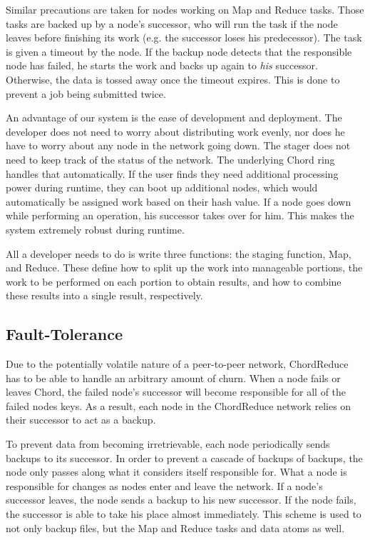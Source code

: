 \documentclass[10pt, conference, compsocconf]{IEEEtran}
\begin{document}
Similar precautions are taken for nodes working on Map and Reduce tasks.  Those tasks are backed up by a node's successor, who will run the task if the node leaves before finishing its work (e.g. the successor loses his predecessor).   The task is given a timeout by the node.  If the backup node detects that the responsible node has failed, he starts the work and backs up again to \emph{his} successor.  Otherwise, the data is tossed away once the timeout expires. This is done to prevent a job being submitted twice.

An advantage of our system is the ease of development and deployment.  The developer does not need to worry about distributing work evenly, nor does he have to worry about any node in the network going down.  The stager does not need to keep track of the status of the network.  The underlying Chord ring handles that automatically.  If the user finds they need additional processing power during runtime, they can boot up additional nodes, which would automatically be assigned work based on their hash value.   If a node goes down while performing an operation, his successor takes over for him.  This makes the system extremely robust during runtime.

All a developer needs to do is write three functions: the staging function, Map, and Reduce.  These define how to split up the work into manageable portions, the work to be performed on each portion to obtain results, and how to combine these results into a single result, respectively. 



\subsection{Fault-Tolerance}
Due to the potentially volatile nature of a peer-to-peer network, ChordReduce has to be able to handle an arbitrary amount of churn. When a node fails or leaves Chord, the failed node's successor will become responsible for all of the failed nodes keys. As a result, each node in the ChordReduce network relies on their successor to act as a backup.  

To prevent data from becoming irretrievable, each node periodically sends backups to its successor.  In order to prevent a cascade of backups of backups, the node only passes along what it considers itself responsible for.  What a node is responsible for changes as nodes enter and leave the network.  If a node's successor leaves, the node sends a backup to his new successor.  If the node fails, the successor is able to take his place almost immediately.  This scheme is used to not only backup files, but the Map and Reduce tasks and data atoms as well.
\end{document}
